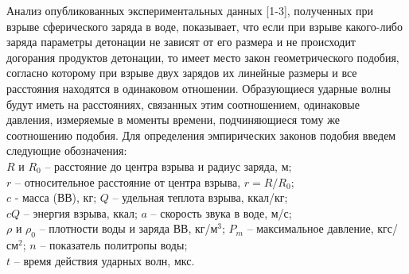 \documentclass[specialist, subf, href, colorlinks=true, 14pt, final]{disser}
\theoremstyle{definition}
\begin{document}
Анализ опубликованных экспериментальных данных [1-3], полученных при взрыве сферического заряда в воде, показывает, что если при взрыве какого-либо заряда параметры детонации не зависят от его размера и не происходит догорания продуктов детонации, то имеет место закон геометрического подобия, согласно которому при взрыве двух зарядов их линейные размеры и все расстояния находятся в одинаковом отношении. Образующиеся ударные волны будут иметь на расстояниях, связанных этим соотношением, одинаковые давления, измеряемые в моменты времени, подчиняющиеся тому же соотношению подобия. Для определения эмпирических законов подобия введем следующие обозначения:\\
$R$ и $R_0$ -- расстояние до центра взрыва и радиус заряда, м;\\
$r$ -- относительное расстояние от центра взрыва, $r = R/R_0$;\\
$c$ - масса (ВВ), кг; $Q$ -- удельная теплота взрыва, ккал/кг;\\
$cQ$ -- энергия взрыва, ккал; $a$ -- скорость звука в воде, м/с;\\
$\rho$ и $\rho_0$ -- плотности воды и заряда ВВ, кг/м$^3$; $P_m$ -- максимальное давление, кгс/см$^2$; $n$ -- показатель политропы воды;\\
$t$ -- время действия ударных волн, мкс.
\end{document}
